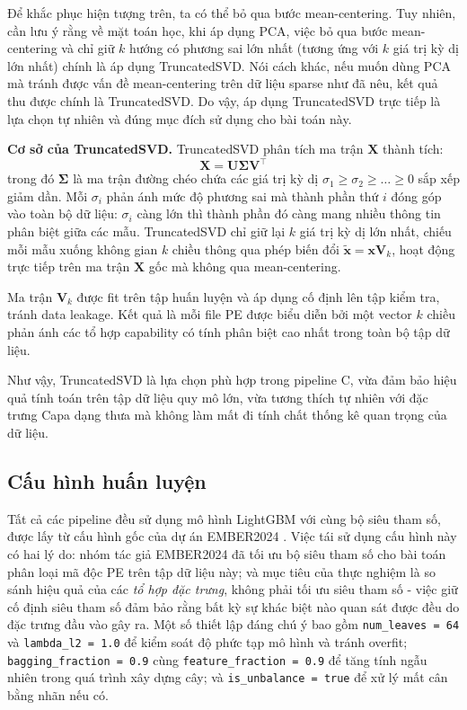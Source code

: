 Để khắc phục hiện tượng trên, ta có thể bỏ qua bước mean-centering.
Tuy nhiên, cần lưu ý rằng về mặt toán học, khi áp dụng PCA, việc bỏ qua bước
mean-centering và chỉ giữ $k$ hướng có phương sai lớn nhất (tương ứng với
$k$ giá trị kỳ dị lớn nhất) chính là áp dụng TruncatedSVD.
Nói cách khác, nếu muốn dùng PCA mà tránh được vấn đề mean-centering
trên dữ liệu sparse như đã nêu, kết quả thu được chính là TruncatedSVD.
Do vậy, áp dụng TruncatedSVD trực tiếp là lựa chọn tự nhiên và đúng
mục đích sử dụng cho bài toán này.

\textbf{Cơ sở của TruncatedSVD.}
TruncatedSVD phân tích ma trận $\mathbf{X}$ thành tích:
\begin{equation}
    \mathbf{X} = \mathbf{U} \mathbf{\Sigma} \mathbf{V}^\top
\end{equation}
trong đó $\mathbf{\Sigma}$ là ma trận đường chéo chứa các giá trị kỳ
dị $\sigma_1 \geq \sigma_2 \geq \dots \geq 0$ sắp xếp giảm dần. Mỗi
$\sigma_i$ phản ánh mức độ phương sai mà thành phần thứ $i$ đóng góp
vào toàn bộ dữ liệu: $\sigma_i$ càng lớn thì thành phần đó càng mang
nhiều thông tin phân biệt giữa các mẫu. TruncatedSVD chỉ giữ lại $k$
giá trị kỳ dị lớn nhất, chiếu mỗi mẫu xuống không gian $k$ chiều
thông qua phép biến đổi $\tilde{\mathbf{x}} = \mathbf{x}\mathbf{V}_k$,
hoạt động trực tiếp trên ma trận $\mathbf{X}$ gốc mà không qua
mean-centering.

Ma trận $\mathbf{V}_k$ được fit trên tập huấn luyện và áp dụng cố
định lên tập kiểm tra, tránh data leakage. Kết quả là mỗi file PE
được biểu diễn bởi một vector $k$ chiều phản ánh các tổ hợp
capability có tính phân biệt cao nhất trong toàn bộ tập dữ liệu.

Như vậy, TruncatedSVD là lựa chọn phù hợp trong pipeline C, 
vừa đảm bảo hiệu quả tính toán trên
tập dữ liệu quy mô lớn, vừa tương thích tự nhiên với đặc trưng Capa
dạng thưa mà không làm mất đi tính chất thống kê quan trọng của dữ
liệu.

\subsection{Cấu hình huấn luyện}

Tất cả các pipeline đều sử dụng mô hình LightGBM với cùng bộ siêu
tham số, được lấy từ cấu hình gốc của dự án EMBER2024
\cite{ember2024benchmark}. Việc tái sử dụng cấu hình này có hai lý
do: nhóm tác giả EMBER2024 đã tối ưu bộ siêu tham số cho bài toán
phân loại mã độc PE trên tập dữ liệu này; và mục tiêu của thực nghiệm
là so sánh hiệu quả của các \textit{tổ hợp đặc trưng}, không phải
tối ưu siêu tham số - việc giữ cố định siêu tham số đảm bảo rằng
bất kỳ sự khác biệt nào quan sát được đều do đặc trưng đầu vào gây
ra. Một số thiết lập đáng chú ý bao gồm \texttt{num\_leaves = 64} và
\texttt{lambda\_l2 = 1.0} để kiểm soát độ phức tạp mô hình và tránh
overfit; \texttt{bagging\_fraction = 0.9} cùng
\texttt{feature\_fraction = 0.9} để tăng tính ngẫu nhiên trong quá
trình xây dựng cây; và \texttt{is\_unbalance = true} để xử lý mất
cân bằng nhãn nếu có.

